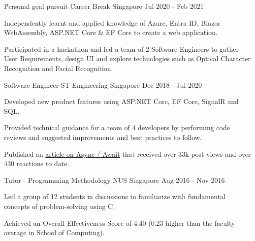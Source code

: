 \begin{cventries}
\cventry
{Personal goal pursuit} %
{Career Break} %
{Singapore} %
{Jul 2020 - Feb 2021} %
{
  \begin{cvitems} %
    \item {Independently learnt and applied knowledge of Azure, Entra ID, Blazor WebAssembly, ASP.NET Core \& EF Core to create a web application.}
    \item {Participated in a hackathon and led a team of 2 Software Engineers to gather User Requirements, design UI and explore technologies such as Optical Character Recognition and Facial Recognition.}
  \end{cvitems}
}

  \cventry
    {Software Engineer} %
    {ST Engineering} %
    {Singapore} %
    {Dec 2018 - Jul 2020} %
    {
      \begin{cvitems} %
        \item {Developed new product features using ASP.NET Core, EF Core, SignalR and SQL.}
        \item {Provided technical guidance for a team of 4 developers by performing code reviews and suggested improvements and best practices to follow.}
        \item {Published an \href{https://bit.ly/zy-async}{article on Async / Await} that received over 33k post views and over 430 reactions to date.}
      \end{cvitems}
    }


  \cventry
    {Tutor - Programming Methodology} %
    {NUS} %
    {Singapore} %
    {Aug 2016 - Nov 2016} %
    {
      \begin{cvitems} %
        \item {Led a group of 12 students in discussions to familiarize with fundamental concepts of problem-solving using C.}
        \item {Achieved an Overall Effectiveness Score of 4.40 (0.23 higher than the faculty average in School of Computing).}
      \end{cvitems}
    }

\end{cventries}

